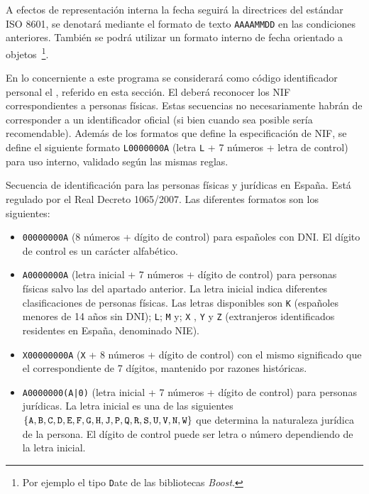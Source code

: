 \documentclass[11pt, a4paper, twoside]{report}
\begin{document}
			A efectos de representación interna la fecha seguirá la directrices del estándar ISO 8601, se denotará mediante el formato de texto \verb|AAAAMMDD| en las condiciones anteriores. También se podrá utilizar un formato interno de fecha orientado a objetos~\footnote{Por ejemplo el tipo {\texttt Date} de las bibliotecas \textit{Boost}.}.

					En lo concerniente a este programa se considerará como código identificador personal el , referido en esta sección. El \software deberá reconocer los NIF correspondientes a personas físicas. Estas secuencias no necesariamente habrán de corresponder a un identificador oficial (si bien cuando sea posible sería recomendable). Además de los formatos que define la especificación de NIF, se define el siguiente formato \verb|L0000000A| (letra \verb|L| + 7 números + letra de control) para uso interno, validado según las mismas reglas. \label{srs:idpersonal}

				 \label{srs:nif}
					Secuencia de identificación para las personas físicas y jurídicas en España. Está regulado por el Real Decreto 1065/2007. Las diferentes formatos son los siguientes:

				\begin{itemize}
					\item \verb|00000000A| (8 números + dígito de control) para españoles con \gls{DNI}. El dígito de control es un carácter alfabético.
					\item \verb|A0000000A| (letra inicial + 7 números + dígito de control) para personas físicas salvo las del apartado anterior. La letra inicial indica diferentes clasificaciones de personas físicas. Las letras disponibles son \verb|K| (españoles menores de 14 años sin DNI); \verb|L|; \verb|M| y; \verb|X| , \verb|Y| y \verb|Z| (extranjeros identificados residentes en España, denominado \gls{NIE}).
					\item \verb|X00000000A| (\verb|X| + 8 números + dígito de control) con el mismo significado que el correspondiente de 7 dígitos, mantenido por razones históricas. 
					\item \verb:A0000000(A|0): (letra inicial + 7 números + dígito de control) para personas jurídicas. La letra inicial es una de las siguientes $\{ \verb|A|, \verb|B|, \verb|C|, \verb|D|, \verb|E|, \verb|F|, \verb|G|, \verb|H|, \verb|J|, \verb|P|, \verb|Q|, \verb|R|, \verb|S|, \verb|U|, \verb|V|, \verb|N|, \verb|W| \}$ que determina la naturaleza jurídica de la persona. El dígito de control puede ser letra o número dependiendo de la letra inicial.\\
				 \end{itemize}
				
\end{document}
